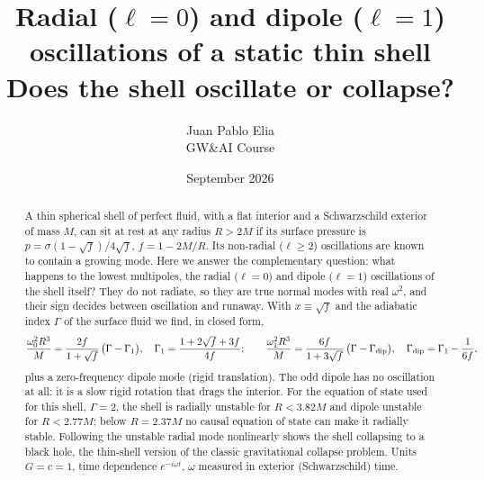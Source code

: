 \documentclass[10.5pt,a4paper]{article}
\title{\vspace{-8mm}\textbf{Radial ($\ell=0$) and dipole ($\ell=1$) oscillations of a static thin shell}\\[3pt]
\large Does the shell oscillate or collapse?}
\author{Juan Pablo Elia\\ \small GW\&AI Course}
\date{September 2026}
\newcommand{\sq}{\sqrt{f}}
\begin{document}
\maketitle
\vspace{-5mm}

\begin{abstract}\noindent
A thin spherical shell of perfect fluid, with a flat interior and a Schwarzschild exterior of mass $M$, can sit at
rest at any radius $R>2M$ if its surface pressure is $p=\sigma(1-\sq)/4\sq$, $f=1-2M/R$. Its non-radial ($\ell\ge2$)
oscillations are known to contain a growing mode. Here we answer the complementary question: what happens to the
lowest multipoles, the radial ($\ell=0$) and dipole ($\ell=1$) oscillations of the shell itself? They do not radiate, so
they are true normal modes with real $\omega^2$, and their sign decides between oscillation and runaway. With
$x\equiv\sq$ and the adiabatic index $\Gamma$ of the surface fluid we find, in closed form,
\[
\frac{\omega_0^2R^3}{M}=\frac{2f}{1+\sq}\,\big(\Gamma-\Gamma_1\big),\quad \Gamma_1=\frac{1+2\sq+3f}{4f};\qquad
\frac{\omega_1^2R^3}{M}=\frac{6f}{1+3\sq}\,\big(\Gamma-\Gamma_{\rm dip}\big),\quad \Gamma_{\rm dip}=\Gamma_1-\frac1{6f},
\]
plus a zero-frequency dipole mode (rigid translation). The odd dipole has no oscillation at all: it is a slow rigid
rotation that drags the interior. For the equation of state used for this shell, $\Gamma=2$, the shell is radially
unstable for $R<3.82M$ and dipole unstable for $R<2.77M$; below $R=2.37M$ no causal equation of state can make it
radially stable. Following the unstable radial mode nonlinearly shows the shell collapsing to a black hole, the
thin-shell version of the classic gravitational collapse problem. Units $G=c=1$, time dependence $e^{-i\omega t}$,
$\omega$ measured in exterior (Schwarzschild) time.
\end{abstract}
\end{document}
